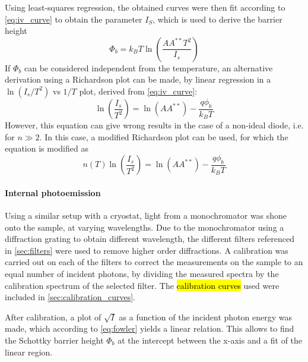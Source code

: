 Using least-squares regression, the obtained curves were then fit according to \autoref{eq:iv_curve} to obtain the parameter $I_S$, which is used to derive the barrier height
\begin{equation}
    \Phi_b = k_B T \ln\left(\frac{A A^{**} T^2}{I_s}\right)
\end{equation}
If $\Phi_b$ can be considered independent from the temperature, an alternative derivation using a Richardson plot can be made, by linear regression in a $\ln(I_s/T^2)$ vs $1/T$ plot, derived from \autoref{eq:iv_curve}:
\begin{equation} \label{eq:richardson}
    \ln \left(\frac{I_s}{T^2}\right) = \ln(A A^{**}) - \frac{q \phi_b}{k_B T}
\end{equation}
However, this equation can give wrong results in the case of a non-ideal diode, i.e. for $n \gg 2$. In this case, a modified Richardson plot can be used, for which the equation is modified as \cite{bhuiyan_new_1988}
\begin{equation} \label{eq:modified_richardson}
    n(T) \ln \left(\frac{I_s}{T^2}\right) = \ln(A A^{**}) - \frac{q \phi_b}{k_B T}
\end{equation}

\paragraph{Internal photoemission}
Using a similar setup with a cryostat, light from a monochromator was shone onto the sample, at varying wavelengths.
Due to the monochromator using a diffraction grating to obtain different wavelength, the different filters referenced in \autoref{sec:filters} were used to remove higher order diffractions.
A calibration was carried out on each of the filters to correct the measurements on the sample to an equal number of incident photons, by dividing the measured spectra by the calibration spectrum of the selected filter.
The \hl{calibration curves} used were included in \autoref{sec:calibration_curves}.

After calibration, a plot of $\sqrt{I}$ as a function of the incident photon energy was made, which according to \autoref{eq:fowler} yields a linear relation.
This allows to find the Schottky barrier height $\Phi_b$ at the intercept between the x-axis and a fit of the linear region.
